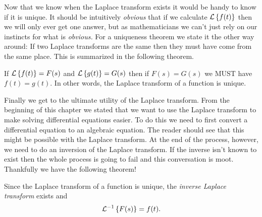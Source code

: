 Now that we know when the Laplace transform exists it would be handy to know if it is
unique.  It should be intuitively {\it obvious} that if we calculate $\mathcal{L}\left\{ f(t) \right\}$ then we
will only ever get one answer, but as mathematicians we can't just rely on our instincts
for what is {\it obvious.}  For a uniqueness theorem we state it the other way around:  If
two Laplace transforms are the same then they must have come from the same place.  This is
summarized in the following theorem.
\begin{thm}
    If $\mathcal{L}\left\{ f(t) \right\} = F(s)$ and $\mathcal{L}\left\{ g(t) \right\} =
    G(s)$ then if $F(s) = G(s)$ we MUST have $f(t) = g(t)$.  In other words, the
    Laplace transform of a function is unique.
\end{thm}

Finally we get to the ultimate utility of the Laplace transform.  From the beginning of
this chapter we stated that we want to use the Laplace transform to make solving
differential equations easier.  To do this we need to first convert a differential
equation to an algebraic equation.  The reader should see that this might be possible with
the Laplace transform.  At the end of the process, however, we need to do an inversion of
the Laplace transform.  If the inverse isn't known to exist then the whole process is
going to fail and this conversation is moot.  Thankfully we have the following theorem!
\begin{thm}
    Since the Laplace transform of a function is unique, the {\it inverse Laplace
    transform} exists and
    \[ \mathcal{L}^{-1}\left\{ F(s) \right\} = f(t). \]
\end{thm}



